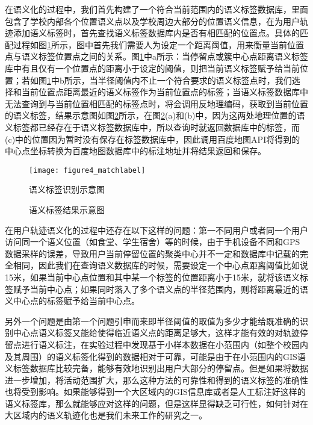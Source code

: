\par 在语义化的过程中，我们首先构建了一个符合当前范围内的语义标签数据库，里面包含了学校内部各个位置语义点以及学校周边大部分的位置语义信息，在为用户轨迹添加语义标签时，首先查找语义标签数据库内是否有相匹配的位置点。具体的匹配过程如图\ref{fig:matchlabel}所示，图中首先我们需要人为设定一个距离阈值，用来衡量当前位置点与语义标签位置点之间的关系。图\ref{fig:matchlabel}中a所示：当停留点或簇中心点距离语义标签库中有且仅有一个位置点的距离小于设定的阈值，则把当前语义标签赋予给当前位置；若如图\ref{fig:matchlabel}中b所示，当半径阈值内不止一个符合要求的语义标签点时，我们选择和当前位置点距离最近的语义标签作为当前位置点的标签；当语义标签数据库中无法查询到与当前位置相匹配的标签点时，将会调用反地理编码，获取到当前位置的语义标签，结果示意图如图\ref{fig:map_label}所示，在图\ref{fig:map_label}(a)和(b)中，因为这两处地理位置的语义标签都已经存在于语义标签数据库中，所以查询时就返回数据库中的标签，而(c)中的位置因为暂时没有保存在标签数据库中，因此调用百度地图API将得到的中心点坐标转换为百度地图数据库中的标注地址并将结果返回和保存。
\begin{figure}[htp]
\centering
\texttt{[image: figure4\_matchlabel]}
\caption{语义标签识别示意图}
\label{fig:matchlabel}
\end{figure}

\begin{figure}[htb]
  \centering%
  \hspace{4em}%
  \hspace{4em}%
  \caption{语义标签结果示意图}
  \label{fig:map_label}

\end{figure}
\par 在用户轨迹语义化的过程中还存在以下这样的问题：第一不同用户或者同一个用户访问同一个语义位置（如食堂、学生宿舍）等的时候，由于手机设备不同和GPS数据采样的误差，导致用户当前停留位置的聚类中心并不一定和数据库中记载的完全相同，因此我们在查询语义数据库的时候，需要设定一个中心点距离阈值比如说15米，如果当前中心点位置和其中某一个标签的位置距离小于15米，就将该语义标签赋予当前中心点；如果同时落入了多个语义点的半径范围内，则将距离最近的语义中心点的标签赋予给当前中心点。
\par 另外一个问题是由第一个问题引申而来即半径阈值的取值为多少才能给既准确的识别中心点语义标签又能给使得临近语义点的距离足够大，这样才能有效的对轨迹停留点进行语义标注，在实验过程中发现基于小样本数据在小范围内（如整个校园内及其周围）的语义标签化得到的数据相对于可靠，可能是由于在小范围内的GIS语义标签数据库比较完备，能够有效地识别出用户大部分的停留点。但是如果将数据进一步增加，将活动范围扩大，那么这种方法的可靠性和得到的语义标签的准确性也将受到影响。如果能够得到一个大区域内的GIS信息库或者是人工标注好这样的语义标签库，那么就能够应对这样的问题，但是这样显得缺乏可行性，如何针对在大区域内的语义轨迹化也是我们未来工作的研究之一。

